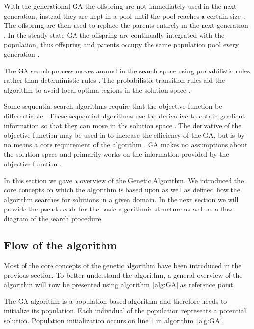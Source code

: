 With the generational GA the offspring are not immediately used in the next generation, instead they are kept in a pool until the pool reaches a certain size \cite{FamilyGA}. The offspring are then used to replace the parents entirely in the next generation \cite{FamilyGA}. In the steady-state GA the offspring are continually integrated with the population, thus offspring and parents occupy the same population pool every generation \cite{GeostatisticalGA,FamilyGA}.

The GA search process moves around in the search space using probabilistic rules rather than deterministic rules \cite{FamilyGA}. The probabilistic transition rules aid the algorithm to avoid local optima regions in the solution space \cite{HybridIntelliGA}. 

Some sequential search algorithms require that the objective function be differentiable \cite{ConstrainedGA}. These sequential algorithms use the derivative to obtain gradient information so that they can move in the solution space \cite{ConstrainedGA,SelfAdaptiveGA}. The derivative of the objective function may be used in to increase the efficiency of the GA, but is by no means a core requirement of the algorithm \cite{ConstrainedGA,HybridIntelliGA,SelfAdaptiveGA}. GA makes no assumptions about the solution space and primarily works on the information provided by the objective function \cite{ConstrainedGA,HybridIntelliGA}. 

In this section we gave a overview of the Genetic Algorithm. We introduced the core concepts on which the algorithm is based upon as well as defined how the algorithm searches for solutions in a given domain. In the next section we will provide the pseudo code for the basic algorithmic structure as well as a flow diagram of the search procedure.

\subsection{Flow of the algorithm}
Most of the core concepts of the genetic algorithm have been introduced in the previous section. To better understand the algorithm, a general overview of the algorithm will now be presented using algorithm~\ref{alg:GA} as reference point.

The GA algorithm is a population based algorithm and therefore needs to initialize its population. Each individual of the population represents a potential solution. Population initialization occurs on line 1 in algorithm~\ref{alg:GA}.

